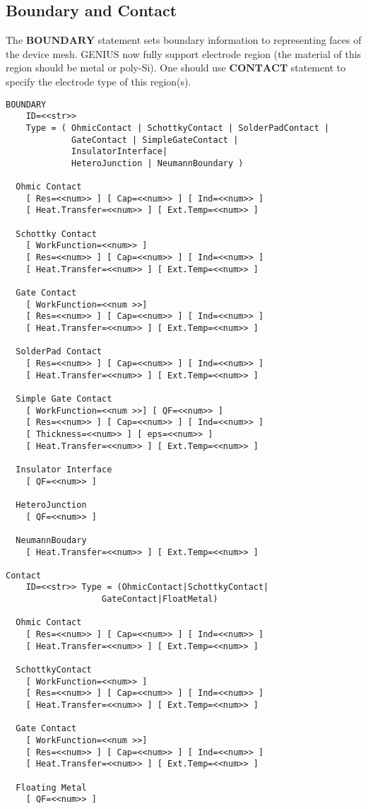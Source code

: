 \documentclass[oneside,12pt]{cgd_book}
\begin{document}
\subsection{Boundary and Contact}
The
$\mathbf{BOUNDARY}$ statement sets boundary information to representing faces of the
        device mesh. GENIUS now fully support electrode region (the material of this region should be metal or poly-Si).
        One should use $\mathbf{CONTACT}$ statement to specify the electrode type of this region(s).
\par
\begin{lstlisting}[style=GeniusCmd]
BOUNDARY
    ID=<<str>>
    Type = ( OhmicContact | SchottkyContact | SolderPadContact |
             GateContact | SimpleGateContact |
             InsulatorInterface|
             HeteroJunction | NeumannBoundary )

  Ohmic Contact
    [ Res=<<num>> ] [ Cap=<<num>> ] [ Ind=<<num>> ]
    [ Heat.Transfer=<<num>> ] [ Ext.Temp=<<num>> ]

  Schottky Contact
    [ WorkFunction=<<num>> ]
    [ Res=<<num>> ] [ Cap=<<num>> ] [ Ind=<<num>> ]
    [ Heat.Transfer=<<num>> ] [ Ext.Temp=<<num>> ]

  Gate Contact
    [ WorkFunction=<<num >>]
    [ Res=<<num>> ] [ Cap=<<num>> ] [ Ind=<<num>> ]
    [ Heat.Transfer=<<num>> ] [ Ext.Temp=<<num>> ]

  SolderPad Contact
    [ Res=<<num>> ] [ Cap=<<num>> ] [ Ind=<<num>> ]
    [ Heat.Transfer=<<num>> ] [ Ext.Temp=<<num>> ]

  Simple Gate Contact
    [ WorkFunction=<<num >>] [ QF=<<num>> ]
    [ Res=<<num>> ] [ Cap=<<num>> ] [ Ind=<<num>> ]
    [ Thickness=<<num>> ] [ eps=<<num>> ]
    [ Heat.Transfer=<<num>> ] [ Ext.Temp=<<num>> ]

  Insulator Interface
    [ QF=<<num>> ]

  HeteroJunction
    [ QF=<<num>> ]

  NeumannBoudary
    [ Heat.Transfer=<<num>> ] [ Ext.Temp=<<num>> ]

Contact
    ID=<<str>> Type = (OhmicContact|SchottkyContact|
                   GateContact|FloatMetal)

  Ohmic Contact
    [ Res=<<num>> ] [ Cap=<<num>> ] [ Ind=<<num>> ]
    [ Heat.Transfer=<<num>> ] [ Ext.Temp=<<num>> ]

  SchottkyContact
    [ WorkFunction=<<num>> ]
    [ Res=<<num>> ] [ Cap=<<num>> ] [ Ind=<<num>> ]
    [ Heat.Transfer=<<num>> ] [ Ext.Temp=<<num>> ]

  Gate Contact
    [ WorkFunction=<<num >>]
    [ Res=<<num>> ] [ Cap=<<num>> ] [ Ind=<<num>> ]
    [ Heat.Transfer=<<num>> ] [ Ext.Temp=<<num>> ]

  Floating Metal
    [ QF=<<num>> ]
\end{lstlisting}
\par
\end{document}
